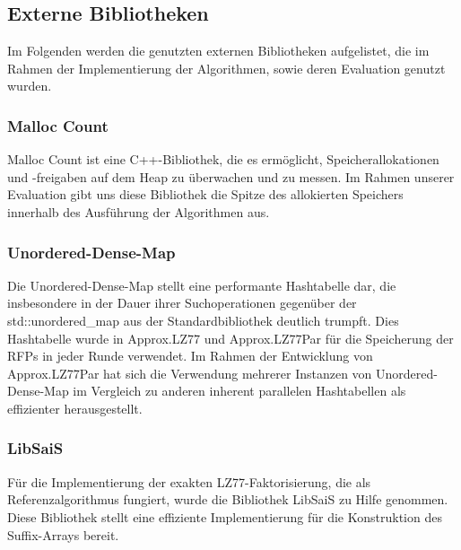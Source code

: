 \subsection{Externe Bibliotheken}
Im Folgenden werden die genutzten externen Bibliotheken aufgelistet, die im Rahmen der Implementierung der Algorithmen, sowie deren Evaluation genutzt wurden.
\subsubsection{Malloc Count} \label{malloccount}
Malloc Count\cite{malloc_count} ist eine C++-Bibliothek, die es ermöglicht, Speicherallokationen und -freigaben auf dem Heap zu überwachen und zu messen. Im
Rahmen unserer Evaluation gibt uns diese Bibliothek die Spitze des allokierten Speichers innerhalb des Ausführung der Algorithmen aus.

\subsubsection{Unordered-Dense-Map} \label{unordereddense}
Die Unordered-Dense-Map \cite{unordered_dense} stellt eine performante Hashtabelle dar, die insbesondere in der Dauer ihrer Suchoperationen gegenüber
der std::unordered\_map aus der Standardbibliothek deutlich trumpft. Dies Hashtabelle wurde in Approx.LZ77 und Approx.LZ77Par für die Speicherung der
RFPs in jeder Runde verwendet. Im Rahmen der Entwicklung von Approx.LZ77Par hat sich die Verwendung mehrerer Instanzen von Unordered-Dense-Map im Vergleich
zu anderen inherent parallelen Hashtabellen \cite{oneapi} \cite{sharded_map} als effizienter herausgestellt.

\subsubsection{LibSaiS}
Für die Implementierung der exakten LZ77-Faktorisierung, die als Referenzalgorithmus fungiert, wurde die Bibliothek LibSaiS\cite{libsais} zu Hilfe genommen. Diese
Bibliothek stellt eine effiziente Implementierung für die Konstruktion des Suffix-Arrays bereit.

